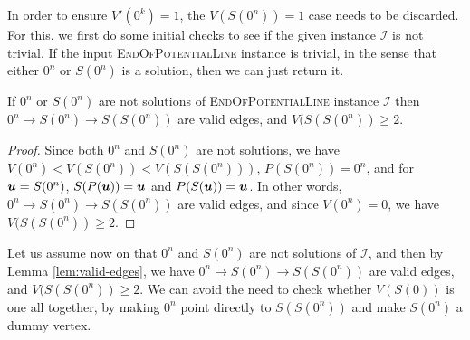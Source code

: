 \documentclass[a4paper,UKenglish]{lipics2}
\theoremstyle{definition}
\def\problem#1{\textsc{#1}}
\def\EOPL{\problem{EndOfPotentialLine}\xspace}
\newcommand{\CI}{\mbox{${\mathcal I}$}}
\newcommand{\uu}{\mbox{\boldmath $u$}}
\begin{document}
%
In order to ensure $V'(0^k)=1$, the $V(S(0^n))=1$ case needs to be discarded. For
this, we first do some initial checks to see if the given instance $\CI$ is not
trivial.  If the input \EOPL instance is trivial, in the sense that either
$0^n$ or $S(0^n)$ is a solution, then we can just return it.

\begin{lemma}
\label{lem:valid-edges}
If $0^n$ or $S(0^n)$ are not solutions of \EOPL instance $\CI$ then $0^n
\rightarrow S(0^n) \rightarrow S(S(0^n))$ are valid edges, and $V(S(S(0^n))\ge 2$. 
\end{lemma}

\begin{proof}
Since both $0^n$ and $S(0^n)$ are not solutions, we have
	$V(0^n)<V(S(0^n))<V(S(S(0^n)))$, $P(S(0^n))=0^n$, and for $\uu = S(0^n)$,
	$S(P(\uu))=\uu$ and $P(S(\uu))=\uu$. In other words, $0^n \rightarrow S(0^n)
	\rightarrow S(S(0^n))$ are valid edges, and since $V(0^n)=0$, we have
	$V(S(S(0^n))\ge 2$. 
\end{proof}

Let us assume now on that $0^n$ and $S(0^n)$ are not solutions of $\CI$, and
then by Lemma \ref{lem:valid-edges}, we have $0^n \rightarrow S(0^n) \rightarrow
S(S(0^n))$ are valid edges, and $V(S(S(0^n))\ge 2$. We can avoid the need to check
whether $V(S(0))$ is one all together, by making $0^n$ point directly to
$S(S(0^n))$ and make $S(0^n)$ a dummy vertex. 
\end{document}
